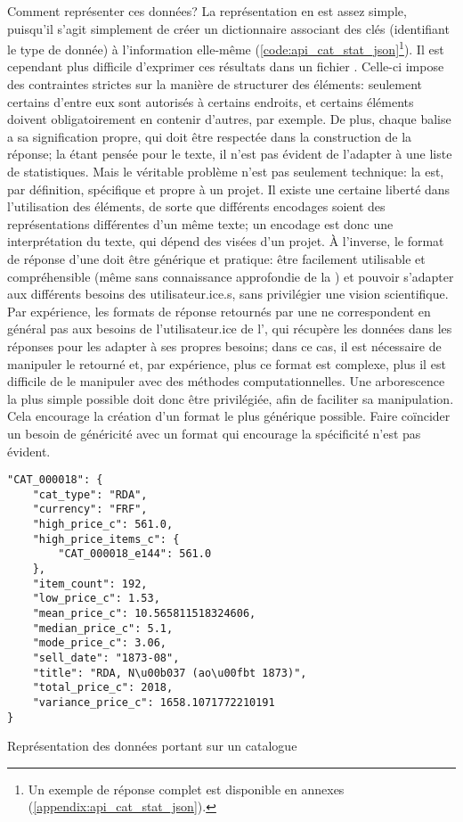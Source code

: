 Comment représenter ces données? La représentation en \json{} est assez simple, puisqu'il s'agit simplement de créer un \gls{dictionnaire} associant des clés (identifiant le type de donnée) à l'information elle-même (\ref{code:api_cat_stat_json}\footnote{
	Un exemple de réponse complet est disponible en annexes (\ref{appendix:api_cat_stat_json}).
}). Il est cependant plus difficile d'exprimer ces résultats dans un fichier \tei{}. Celle-ci impose des contraintes strictes sur la manière de structurer des éléments: seulement certains d'entre eux sont autorisés à certains endroits, et certains éléments doivent obligatoirement en contenir d'autres, par exemple. De plus, chaque balise \tei{} a sa signification propre, qui doit être respectée dans la construction de la réponse; la \tei{} étant pensée pour le texte, il n'est pas évident de l'adapter à une liste de statistiques. Mais le véritable problème n'est pas seulement technique: la \tei{} est, par définition, spécifique et propre à un projet. Il existe une certaine liberté dans l'utilisation des éléments, de sorte que différents encodages soient des représentations différentes d'un même texte; un encodage est donc une interprétation du texte, qui dépend des visées d'un projet. À l'inverse, le format de réponse d'une \api{} doit être générique et pratique: être facilement utilisable et compréhensible (même sans connaissance approfondie de la \tei{}) et pouvoir s'adapter aux différents besoins des utilisateur.ice.s, sans privilégier une vision scientifique. Par expérience, les formats de réponse retournés par une \api{} ne correspondent en général pas aux besoins de l'utilisateur.ice de l'\api{}, qui récupère les données dans les réponses pour les adapter à ses propres besoins; dans ce cas, il est nécessaire de manipuler le \xml{} retourné et, par expérience, plus ce format est complexe, plus il est difficile de le manipuler avec des méthodes computationnelles. Une arborescence la plus simple possible doit donc être privilégiée, afin de faciliter sa manipulation. Cela encourage la création d'un format le plus générique possible. Faire coïncider un besoin de généricité avec un format qui encourage la spécificité n'est pas évident. 


\begin{listing}[h!]
	\begin{verbatim}
"CAT_000018": {
	"cat_type": "RDA",
	"currency": "FRF",
	"high_price_c": 561.0,
	"high_price_items_c": {
		"CAT_000018_e144": 561.0
	},
	"item_count": 192,
	"low_price_c": 1.53,
	"mean_price_c": 10.565811518324606,
	"median_price_c": 5.1,
	"mode_price_c": 3.06,
	"sell_date": "1873-08",
	"title": "RDA, N\u00b037 (ao\u00fbt 1873)",
	"total_price_c": 2018,
	"variance_price_c": 1658.1071772210191
}
	\end{verbatim}
	\caption{Représentation \json{} des données portant sur un catalogue}
	\label{code:api_cat_stat_json}
\end{listing}

